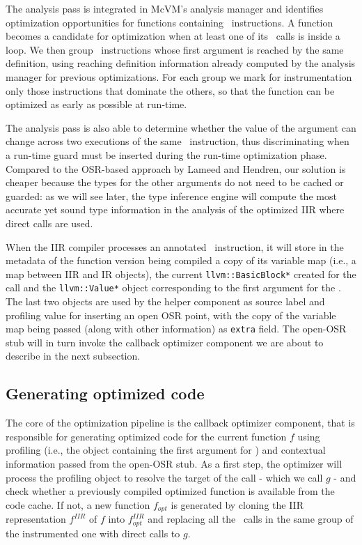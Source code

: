 The analysis pass is integrated in McVM's analysis manager and identifies optimization opportunities for functions containing \feval\ instructions. A function becomes a candidate for optimization when at least one of its \feval\ calls is inside a loop. We then group \feval\ instructions whose first argument is reached by the same definition, using reaching definition information already computed by the analysis manager for previous optimizations. For each group we mark for instrumentation only those instructions that dominate the others, so that the function can be optimized as early as possible at run-time.

The analysis pass is also able to determine whether the value of the argument can change across two executions of the same \feval\ instruction, thus discriminating when a run-time guard must be inserted during the run-time optimization phase. Compared to the OSR-based approach by Lameed and Hendren, our solution is cheaper because the types for the other arguments do not need to be cached or guarded: as we will see later, the type inference engine will compute the most accurate yet sound type information in the analysis of the optimized IIR where direct calls are used.

When the IIR compiler processes an annotated \feval\ instruction, it will store in the metadata of the function version being compiled a copy of its variable map (i.e., a map between IIR and IR objects), the current {\tt llvm::BasicBlock*} created for the call and the {\tt llvm::Value*} object corresponding to the first argument for the \feval. The last two objects are used by the helper component as source label and profiling value for inserting an open OSR point, with the copy of the variable map being passed (along with other information) as {\tt extra} field. The open-OSR stub will in turn invoke the callback optimizer component we are about to describe in the next subsection.

\subsection{Generating optimized code}
The core of the optimization pipeline is the callback optimizer component, that is responsible for generating optimized code for the current function $f$ using profiling (i.e., the object containing the first argument for \feval) and contextual information passed from the open-OSR stub. As a first step, the optimizer will process the profiling object to resolve the target of the call - which we call $g$ -  and check whether a previously compiled optimized function is available from the code cache. If not, a new function $f_{opt}$ is generated by cloning the IIR representation $f^{IIR}$ of $f$ into
 $f^{IIR}_{opt}$ and replacing all the \feval\ calls in the same group of the instrumented one with direct calls to $g$.

